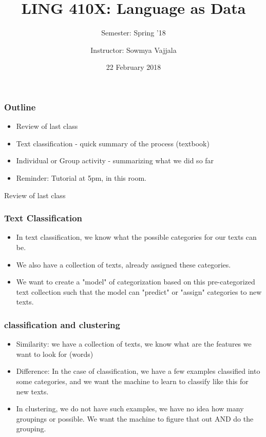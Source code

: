 \documentclass{beamer}
\author[Sowmya Vajjala]{Instructor: Sowmya Vajjala}
\title[LING 410X]{LING 410X: Language as Data}
\subtitle{Semester: Spring '18}
\date{22 February 2018}
\institute{Iowa State University, USA}
\begin{document}
\begin{frame}\titlepage
\end{frame}

\begin{frame}
\frametitle{Outline}
\begin{itemize}
\item Review of last class
\item Text classification - quick summary of the process (textbook)
\item Individual or Group activity - summarizing what we did so far
\item Reminder: Tutorial at 5pm, in this room. 
\end{itemize}
\end{frame}


\begin{frame}
\Large Review of last class
\end{frame}

\begin{frame}
\frametitle{Text Classification}
\begin{itemize}
\item In text classification, we know what the possible categories for our texts can be.
\item We also have a collection of texts, already assigned these categories. \pause
\item We want to create a "model" of categorization based on this pre-categorized text collection such that the model can "predict" or "assign" categories to new texts.
\end{itemize}
\end{frame}

\begin{frame}
\frametitle{classification and clustering}
\begin{itemize}
\item Similarity: we have a collection of texts, we know what are the features we want to look for (words) \pause 
\item Difference: In the case of classification, we have a few examples classified into some categories, and we want the machine to learn to classify like this for new texts. \pause
\item In clustering, we do not have such examples, we have no idea how many groupings or possible. We want the machine to figure that out AND do the grouping. 
\end{itemize}
\end{frame}
\end{document}
